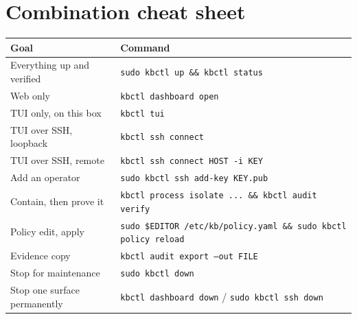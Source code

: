 \section{Combination cheat sheet}
\begin{center}\small
\begin{tabularx}{\textwidth}{@{}L{5.6cm}Y@{}}
\toprule
\textbf{Goal} & \textbf{Command}\\
\midrule
Everything up and verified & \texttt{sudo kbctl up \&\& kbctl status}\\
Web only & \texttt{kbctl dashboard open}\\
TUI only, on this box & \texttt{kbctl tui}\\
TUI over SSH, loopback & \texttt{kbctl ssh connect}\\
TUI over SSH, remote & \texttt{kbctl ssh connect HOST -i KEY}\\
Add an operator & \texttt{sudo kbctl ssh add-key KEY.pub}\\
Contain, then prove it & \texttt{kbctl process isolate ... \&\& kbctl audit verify}\\
Policy edit, apply & \texttt{sudo \$EDITOR /etc/kb/policy.yaml \&\& sudo kbctl policy reload}\\
Evidence copy & \texttt{kbctl audit export --out FILE}\\
Stop for maintenance & \texttt{sudo kbctl down}\\
Stop one surface permanently & \texttt{kbctl dashboard down} / \texttt{sudo kbctl ssh down}\\
\bottomrule
\end{tabularx}
\end{center}
